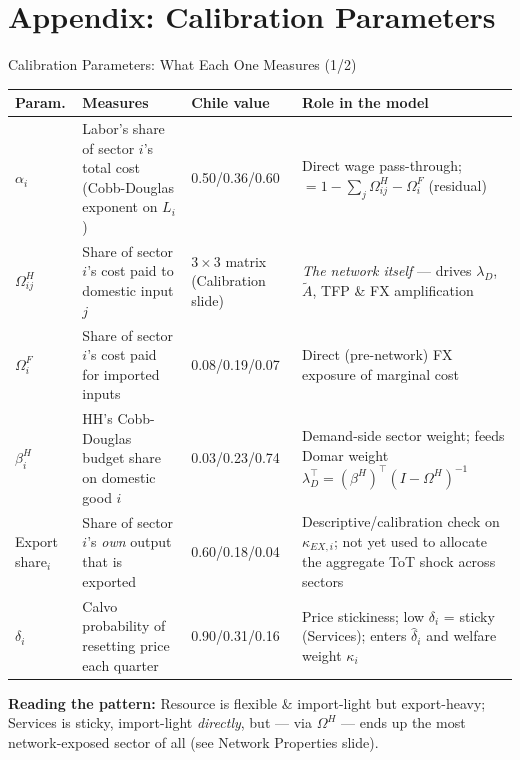 \section*{Appendix: Calibration Parameters}
\begin{frame}{Calibration Parameters: What Each One Measures (1/2)}

{\tiny
\renewcommand{\arraystretch}{1.3}
\begin{tabular}{@{}p{1.3cm}p{3.7cm}p{1.6cm}p{3.0cm}@{}}
\toprule
\textbf{Param.} & \textbf{Measures} & \textbf{Chile value} & \textbf{Role in the model} \\
\midrule
$\alpha_i$ & Labor's share of sector $i$'s total cost (Cobb-Douglas exponent on $L_i$) & 0.50/0.36/0.60 & Direct wage pass-through; $=1-\sum_j\Omega^H_{ij}-\Omega^F_i$ (residual) \\
$\Omega^H_{ij}$ & Share of sector $i$'s cost paid to domestic input $j$ & $3\times3$ matrix (Calibration slide) & \emph{The network itself} --- drives $\lambda_D$, $\tilde A$, TFP \& FX amplification \\
$\Omega^F_i$ & Share of sector $i$'s cost paid for imported inputs & 0.08/0.19/0.07 & Direct (pre-network) FX exposure of marginal cost \\
$\beta^H_i$ & HH's Cobb-Douglas budget share on domestic good $i$ & 0.03/0.23/0.74 & Demand-side sector weight; feeds Domar weight $\lambda_D^\top=(\beta^H)^\top(I-\Omega^H)^{-1}$ \\
Export share$_i$ & Share of sector $i$'s \emph{own} output that is exported & 0.60/0.18/0.04 & Descriptive/calibration check on $\kappa_{EX,i}$; not yet used to allocate the aggregate ToT shock across sectors \\
$\delta_i$ & Calvo probability of resetting price each quarter & 0.90/0.31/0.16 & Price stickiness; low $\delta_i$ = sticky (Services); enters $\hat\delta_i$ and welfare weight $\kappa_i$ \\
\bottomrule
\end{tabular}}

\vspace{6pt}
{\scriptsize \textbf{Reading the pattern:} Resource is flexible \& import-light but export-heavy; Services is sticky, import-light \emph{directly}, but --- via $\Omega^H$ --- ends up the most network-exposed sector of all (see Network Properties slide).}

\end{frame}

